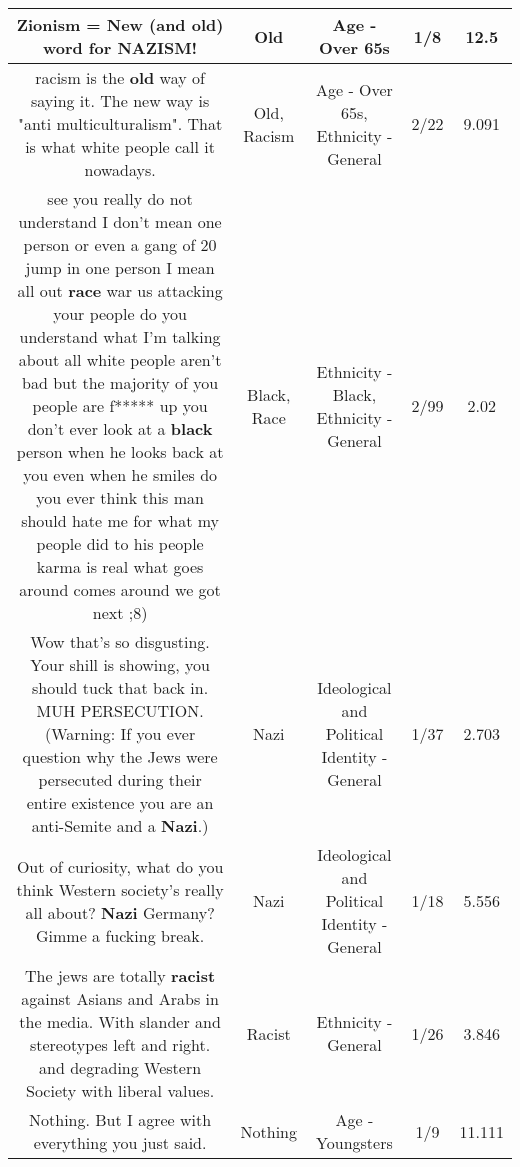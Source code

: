 \documentclass[11pt]{article}
\newlength\mylength
\begin{document}
\begin{center}
\begin{longtable}{|C{.65\mylength}|C{.30\mylength}|C{.12\mylength}|C{.12\mylength}|C{.12\mylength}|}
  \small Zionism = New (and \textbf{old}) word for NAZISM!\normalsize   & Old & Age - Over 65s & 1/8 & 12.5 \\  \hline
  \small racism is the \textbf{old} way of saying it. The new way is "anti multiculturalism". That is what white people call it nowadays.\normalsize   & Old, Racism & Age - Over 65s, Ethnicity - General & 2/22 & 9.091 \\  \hline
  \small see you really do not understand I don't mean one person or even a gang of 20 jump in one person I mean all out \textbf{race} war us attacking your people do you understand what I'm talking about all white people aren't bad but the majority of you people are f***** up you don't ever look at a \textbf{black} person when he looks back at you even when he smiles do you ever think this man should hate me for what my people did to his people karma is real what goes around comes around we got next ;8)\normalsize   & Black, Race & Ethnicity - Black, Ethnicity - General & 2/99 & 2.02 \\  \hline
  \small Wow that's so disgusting. Your shill is showing, you should tuck that back in. MUH PERSECUTION. (Warning: If you ever question why the Jews were persecuted during their entire existence you are an anti-Semite and a \textbf{Nazi}.)\normalsize   & Nazi &  Ideological and Political Identity - General & 1/37 & 2.703 \\  \hline
  \small Out of curiosity, what do you think Western society's really all about? \textbf{Nazi} Germany? Gimme a fucking break.\normalsize   & Nazi &  Ideological and Political Identity - General & 1/18 & 5.556 \\  \hline
  \small The jews are totally \textbf{racist} against Asians and Arabs in the media. With slander and stereotypes left and right. and degrading Western Society with liberal values.\normalsize   & Racist & Ethnicity - General & 1/26 & 3.846 \\  \hline
  \small Nothing. But I agree with everything you just said.\normalsize   & Nothing & Age - Youngsters & 1/9 & 11.111 \\  \hline

\end{longtable}
\end{center}
\end{document}

